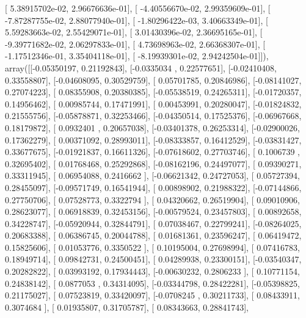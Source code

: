 \documentclass{article}
\begin{document}
       [  5.38915702e-02,   2.96676636e-01],
       [ -4.40556670e-02,   2.99359609e-01],
       [ -7.87287755e-02,   2.88077940e-01],
       [ -1.80296422e-03,   3.40663349e-01],
       [  5.59283663e-02,   2.55429071e-01],
       [  3.01430396e-02,   2.36695165e-01],
       [ -9.39771682e-02,   2.06297833e-01],
       [  4.73698963e-02,   2.66368307e-01],
       [ -1.17512346e-01,   3.35404118e-01],
       [ -8.19939301e-02,   2.94242504e-01]]), array([[-0.05350197,  0.21192843],
       [-0.0335034 ,  0.22577651],
       [-0.02410408,  0.33558807],
       [-0.04608095,  0.30529759],
       [ 0.05701785,  0.20846986],
       [-0.08141027,  0.27074223],
       [ 0.08355908,  0.20380385],
       [-0.05538519,  0.24265311],
       [-0.01720357,  0.14956462],
       [ 0.00985744,  0.17471991],
       [ 0.00453991,  0.20280047],
       [-0.01824832,  0.21555756],
       [-0.05878871,  0.32253466],
       [-0.04350514,  0.17525376],
       [-0.06967668,  0.18179872],
       [ 0.0932401 ,  0.20657038],
       [-0.03401378,  0.26253314],
       [-0.02900026,  0.17362279],
       [ 0.00371092,  0.28993011],
       [-0.08333857,  0.16412529],
       [-0.03831427,  0.33677675],
       [-0.01921837,  0.16611326],
       [-0.07618602,  0.27703746],
       [ 0.1006739 ,  0.32695402],
       [ 0.01768468,  0.25292868],
       [-0.08162196,  0.24497077],
       [ 0.09390271,  0.33311945],
       [ 0.06954088,  0.2416662 ],
       [-0.06621342,  0.24727053],
       [ 0.05727394,  0.28455097],
       [-0.09571749,  0.16541944],
       [ 0.00898902,  0.21988322],
       [-0.07144866,  0.27750706],
       [ 0.07528773,  0.3322794 ],
       [ 0.04320662,  0.26519904],
       [ 0.09010906,  0.28623077],
       [ 0.06918839,  0.32453156],
       [-0.00579524,  0.23457803],
       [ 0.00892658,  0.34228747],
       [-0.05920944,  0.32844791],
       [ 0.07038467,  0.22799241],
       [-0.08264025,  0.20683388],
       [ 0.06386745,  0.20044788],
       [ 0.01681361,  0.23596247],
       [ 0.06419472,  0.15825606],
       [ 0.01053776,  0.3350522 ],
       [ 0.10195004,  0.27698994],
       [ 0.07416783,  0.18949714],
       [ 0.09842731,  0.24500451],
       [ 0.04289938,  0.23300151],
       [-0.03540347,  0.20282822],
       [ 0.03993192,  0.17934443],
       [-0.00630232,  0.2806233 ],
       [ 0.10771154,  0.24838142],
       [ 0.0877053 ,  0.34314095],
       [-0.03344798,  0.28422281],
       [-0.05398825,  0.21175027],
       [ 0.07523819,  0.33420097],
       [-0.0708245 ,  0.30211733],
       [ 0.08433911,  0.3074684 ],
       [ 0.01935807,  0.31705787],
       [ 0.08343663,  0.28841743],
\end{document}
